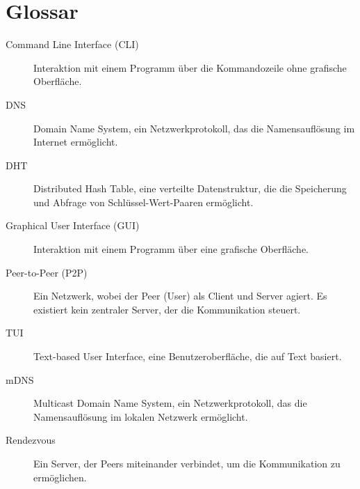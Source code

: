 \section*{Glossar}

\begin{description}
    \item[Command Line Interface (CLI)] Interaktion mit einem Programm über die Kommandozeile ohne grafische Oberfläche.
    \item[DNS] Domain Name System, ein Netzwerkprotokoll, das die Namensauflösung im Internet ermöglicht.
    \item[DHT] Distributed Hash Table, eine verteilte Datenstruktur, die die Speicherung und Abfrage von Schlüssel-Wert-Paaren ermöglicht.
    \item[Graphical User Interface (GUI)] Interaktion mit einem Programm über eine grafische Oberfläche.
    \item[Peer-to-Peer (P2P)] Ein Netzwerk, wobei der Peer (User) als Client und Server agiert. Es existiert kein zentraler Server, der die Kommunikation steuert.
    \item[TUI] Text-based User Interface, eine Benutzeroberfläche, die auf Text basiert.
    \item[mDNS] Multicast Domain Name System, ein Netzwerkprotokoll, das die Namensauflösung im lokalen Netzwerk ermöglicht.
    \item[Rendezvous] Ein Server, der Peers miteinander verbindet, um die Kommunikation zu ermöglichen.
\end{description}


\newpage
